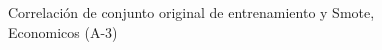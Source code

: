\begin{figure}[H]
    \centering
    
    \caption{Correlación de conjunto original de entrenamiento y Smote, Economicos (A-3)}
    \label{pairwise-economicos-a-3-smote-enc}
\end{figure}